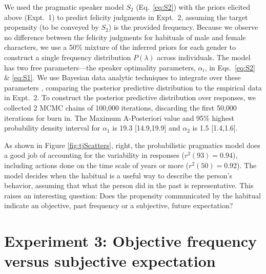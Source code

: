\documentclass[10pt,letterpaper]{article}
\begin{document}
We used the pragmatic speaker model $S_2$ (Eq.~\ref{eq:S2}) with the priors elicited above (Expt.~1) to predict felicity judgments in Expt.~2, assuming the target propensity (to be conveyed by $S_2$) is the provided frequency.
Because we observe no difference between the felicity judgments for habituals of male and female characters, we use a 50\% mixture of the inferred priors for each gender to construct a single frequency distribution $P(\lambda)$ across individuals.
The model has two free parameters---the speaker optimality parameters, $\alpha_i$, in Eqs.~\ref{eq:S2} \& \ref{eq:S1}. 
We use Bayesian data analytic techniques to integrate over these parameters \cite{LW2014}, comparing the posterior predictive distribution to the empirical data in Expt.~2.
To construct the posterior predictive distribution over responses, we collected 2 MCMC chains of 100,000 iterations, discarding the first 50,000 iterations for burn in.
The Maximum A-Posteriori value and 95\% highest probability density interval for $\alpha_1$ is 19.3 [14.9,19.9] and $\alpha_2$ is 1.5 [1.4,1.6].

As shown in Figure \ref{fig:tjScatters}, right, the probabilistic pragmatics model does a good job of accounting for the variability in responses ($r^2(93) = 0.94$), including actions done on the time scale of years or more  ($r^2(50) = 0.92$).
The model decides when the habitual is a useful way to describe the person's behavior, assuming that what the person did in the past is representative. 
This raises an interesting question: Does the propensity communicated by the habitual indicate an objective, past frequency or a subjective, future expectation?


\section{Experiment 3: Objective frequency versus subjective expectation}
\end{document}
